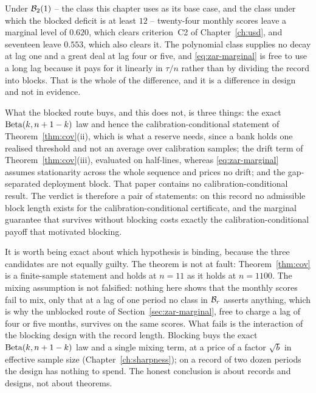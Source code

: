 \documentclass[../../../main.tex]{subfiles}
\begin{document}
Under $\mathcal B_{2}(1)$ -- the class this chapter uses as its base case, and the class under which the blocked deficit is at least $12$ -- twenty-four monthly scores leave a marginal level of $0.620$, which clears criterion~C2 of Chapter~\ref{ch:usd}, and seventeen leave $0.553$, which also clears it. The polynomial class supplies no decay at lag one and a great deal at lag four or five, and \eqref{eq:zar-marginal} is free to use a long lag because it pays for it linearly in $\tau/n$ rather than by dividing the record into blocks. That is the whole of the difference, and it is a difference in design and not in evidence.

What the blocked route buys, and this does not, is three things: the exact $\operatorname{Beta}(k,n+1-k)$ law and hence the calibration-conditional statement of Theorem~\ref{thm:cov}(ii), which is what a reserve needs, since a bank holds one realised threshold and not an average over calibration samples; the drift term of Theorem~\ref{thm:cov}(iii), evaluated on half-lines, whereas \eqref{eq:zar-marginal} assumes stationarity across the whole sequence and prices no drift; and the gap-separated deployment block. That paper contains no calibration-conditional result. The verdict is therefore a pair of statements: on this record no admissible block length exists for the calibration-conditional certificate, and the marginal guarantee that survives without blocking costs exactly the calibration-conditional payoff that motivated blocking.

\begin{remark}\label{rem:zar-whatfails}
It is worth being exact about which hypothesis is binding, because the three candidates are not equally guilty. The theorem is not at fault: Theorem~\ref{thm:cov} is a finite-sample statement and holds at $n=11$ as it holds at $n=1100$. The mixing assumption is not falsified: nothing here shows that the monthly scores fail to mix, only that at a lag of one period no class in $\mathcal B_{r}$ asserts anything, which is why the unblocked route of Section~\ref{sec:zar-marginal}, free to charge a lag of four or five months, survives on the same scores. What fails is the interaction of the blocking design with the record length. Blocking buys the exact $\operatorname{Beta}(k,n+1-k)$ law and a single mixing term, at a price of a factor $\sqrt b$ in effective sample size (Chapter~\ref{ch:sharpness}); on a record of two dozen periods the design has nothing to spend. The honest conclusion is about records and designs, not about theorems.
\end{remark}
\end{document}
